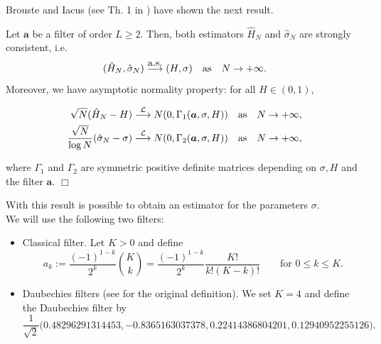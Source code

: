 \documentclass[smallextended]{svjour3}
\begin{document}
Brouste and Iacus (see Th. 1 in \cite{br-ia}) have shown the next result.
\begin{theorem}
    Let  $\bm{a}$ be a filter of order $L \ge 2$. Then, both estimators 
    $\hat{H}_N$ and $\hat{\sigma}_N$  are
    strongly consistent, i.e.
    \[
    ( \hat{H}_N,\hat{\sigma}_N) \stackrel{\hbox{\rm a.s.}}{\longrightarrow} 
    (H,\sigma) \quad \hbox{\rm as}\quad N \rightarrow+\infty.
    \]
    Moreover, we have asymptotic normality property:  for all $H \in (0, 1)$,
    
    \begin{align*}
    \sqrt{N} (\hat{H}_N  - H ) &\stackrel{\mathcal{L}}{\longrightarrow} N (0, 
    \Gamma_1 ( \bm{a},\sigma,H)) \quad  \hbox{\rm as} \quad N
    \rightarrow +\infty,\\
    \frac{\sqrt{N}}{\log N} ( \hat{\sigma}_N  - \sigma ) 
    &\stackrel{\mathcal{L}}{\longrightarrow} N (0, \Gamma_2 (\bm{a},\sigma,H)) 
    \quad
    \hbox{\rm as} \quad N \rightarrow +\infty,
    \end{align*}
    
    where $\Gamma_1$ and $\Gamma_2$ are symmetric positive definite matrices 
    depending on $\sigma, H$ and the filter $\bm{a}$.
    \hfill$\Box$
\end{theorem}

With this result is possible to obtain an estimator for the parameters 
$\sigma$.\\



We will use the following two filters:
\begin{itemize}
    \item Classical filter. Let $K>0$ and define
    \begin{equation*}
    a_k:= \frac{(-1)^{1-k}}{2^k} {K\choose k} =\frac{(-1)^{1-k}}{2^k} 
    \frac{K!}{k!(K-k)!}\qquad \mbox{for }  0\le k\le K.
    \end{equation*}
    
    
    \item Daubechies filters (see \cite{de} for the original definition). We 
    set $K=4$ and define the Daubechies filter by
    \begin{equation*}
    \frac{1}{\sqrt{2}} \big(0.48296291314453, -0.8365163037378, 
    0.22414386804201, 0.12940952255126\big).
    \end{equation*}
    
\end{itemize}
\end{document}
